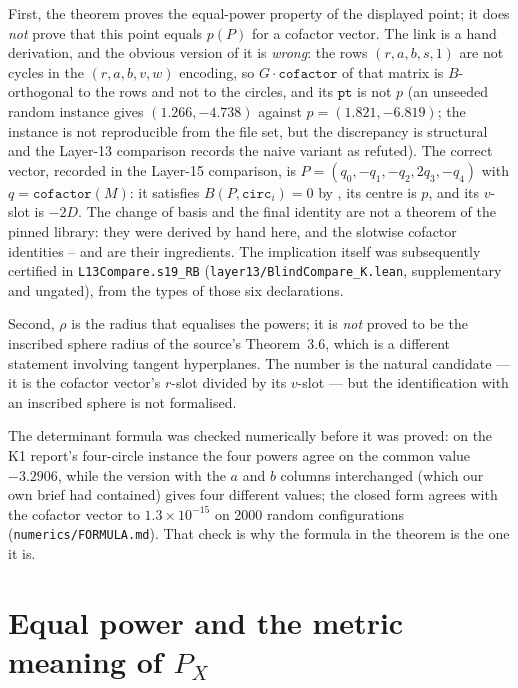 \documentclass[11pt]{article}
\theoremstyle{definition}
\theoremstyle{remark}
\begin{document}
First, the theorem proves the equal-power property of the displayed point; it does \emph{not} prove
that this point equals $p(P)$ for a cofactor vector. The link is a hand derivation, and the obvious
version of it is \emph{wrong}: the rows $(r,a,b,s,1)$ are not cycles in the $(r,a,b,v,w)$ encoding,
so $G\cdot\texttt{cofactor}$ of that matrix is $B$-orthogonal to the rows and not to the circles,
and its $\texttt{pt}$ is not $p$ (an unseeded random instance gives $(1.266,-4.738)$ against
$p=(1.821,-6.819)$; the instance is not reproducible from the file set, but the discrepancy is
structural and the Layer-13 comparison records the naive variant as refuted). The correct vector, recorded in the Layer-15 comparison, is
$P=(q_0,-q_1,-q_2,2q_3,-q_4)$ with $q=\texttt{cofactor}(M)$: it satisfies
$B(P,\texttt{circ}_i)=0$ by , its centre is $p$, and its $v$-slot is
$-2D$. The change of basis and the final identity are not a theorem of the pinned library: they were
derived by hand here, and the slotwise cofactor identities -- and
 are their ingredients. The implication itself was subsequently certified in
\texttt{L13Compare.s19\_RB} (\texttt{layer13/BlindCompare\_K.lean}, supplementary and ungated), from the
types of those six declarations.

Second, $\rho$ is the radius that equalises the powers; it is \emph{not} proved to be the inscribed
sphere radius of the source's Theorem~3.6, which is a different statement involving tangent
hyperplanes. The number is the natural candidate --- it is the cofactor vector's $r$-slot divided by its
$v$-slot --- but the identification with an inscribed sphere is not formalised.

The determinant formula was checked numerically before it was proved: on the K1 report's four-circle
instance the four powers agree on the common value $-3.2906$, while the version with the $a$ and $b$
columns interchanged (which our own brief had contained) gives four different values; the closed form
agrees with the cofactor vector to $1.3\times10^{-15}$ on 2000 random configurations
(\texttt{numerics/FORMULA.md}). That check is why the formula in the theorem is the one it is.

\section{Equal power and the metric meaning of \texorpdfstring{$P_X$}{P\_X}}\label{sec:equalpower}
\end{document}
